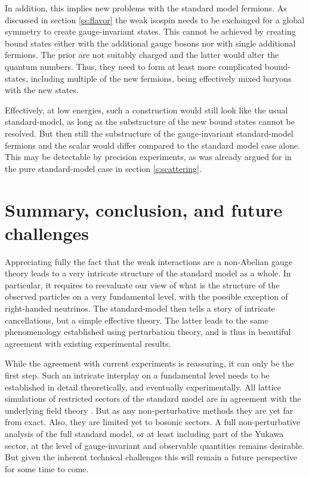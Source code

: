 \documentclass[final,12pt]{article}
\newcommand*{\1}{1\!\!\!\bot}
\begin{document}
In addition, this implies new problems with the standard model fermions. As discussed in section \ref{ss:flavor} the weak isospin needs to be exchanged for a global symmetry to create gauge-invariant states. This cannot be achieved by creating bound states either with the additional gauge bosons nor with single additional fermions. The prior are not suitably charged and the latter would alter the quantum numbers. Thus, they need to form at least more complicated bound-states, including multiple of the new fermions, being effectively mixed baryons with the new states.

Effectively, at low energies, such a construction would still look like the usual standard-model, as long as the substructure of the new bound states cannot be resolved. But then still the substructure of the gauge-invariant standard-model fermions and the scalar would differ compared to the standard model case alone. This may be detectable by precision experiments, as was already argued for in the pure standard-model case in section \ref{s:scattering}.

\section{Summary, conclusion, and future challenges}\label{s:sum}

Appreciating fully the fact that the weak interactions are a non-Abelian gauge theory leads to a very intricate structure of the standard model as a whole. In particular, it requires to reevaluate our view of what is the structure of the observed particles on a very fundamental level, with the possible exception of right-handed neutrinos. The standard-model then tells a story of intricate cancellations, but a simple effective theory. The latter leads to the same phenomenology established using perturbation theory, and is thus in beautiful agreement with existing experimental results.

While the agreement with current experiments is reassuring, it can only be the first step. Such an intricate interplay on a fundamental level needs to be established in detail theoretically, and eventually experimentally. All lattice simulations of restricted sectors of the standard model are in agreement with the underlying field theory \cite{Shrock:1985un,Shrock:1985ur,Lee:1985yi,Maas:2012tj,Maas:2013aia,Raubitzek:unpublished}. But as any non-perturbative methods they are yet far from exact. Also, they are limited yet to bosonic sectors. A full non-perturbative analysis of the full standard model, or at least including part of the Yukawa sector, at the level of gauge-invariant and observable quantities remains desirable. But given the inherent technical challenges this will remain a future perspective for some time to come.
\end{document}
